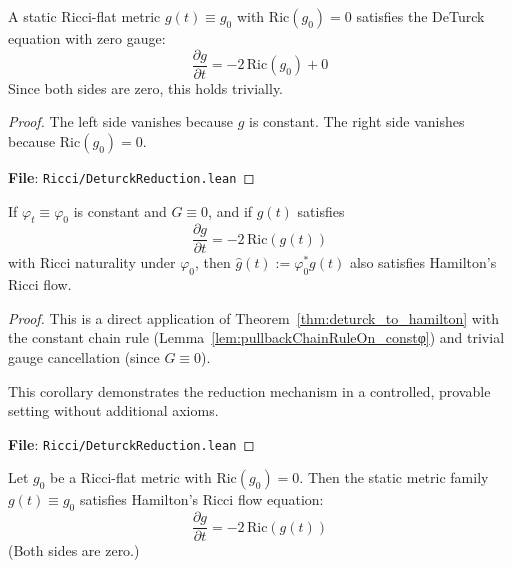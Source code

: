 \begin{lemma}
\label{lem:deturckEqOnWithGauge_ricciFlat_static}
\leanok
{}
A static Ricci-flat metric $g(t) \equiv g_0$ with $\mathrm{Ric}(g_0) = 0$ satisfies the DeTurck equation with zero gauge:
\[ \frac{\partial g}{\partial t} = -2\,\mathrm{Ric}(g_0) + 0 \]
Since both sides are zero, this holds trivially.
\end{lemma}

\begin{proof}
\leanok
The left side vanishes because $g$ is constant. The right side vanishes because $\mathrm{Ric}(g_0) = 0$.

\textbf{File}: \texttt{Ricci/DeturckReduction.lean}
\end{proof}

\begin{corollary}
\label{cor:deturck_to_hamilton_constφ_noGauge}
\leanok
{}
If $\varphi_t \equiv \varphi_0$ is constant and $G \equiv 0$, and if $g(t)$ satisfies
\[ \frac{\partial g}{\partial t} = -2\,\mathrm{Ric}(g(t)) \]
with Ricci naturality under $\varphi_0$, then $\hat{g}(t) := \varphi_0^* g(t)$ also satisfies Hamilton's Ricci flow.
\end{corollary}

\begin{proof}
\leanok
This is a direct application of Theorem~\ref{thm:deturck_to_hamilton} with the constant chain rule (Lemma~\ref{lem:pullbackChainRuleOn_constφ}) and trivial gauge cancellation (since $G \equiv 0$).

This corollary demonstrates the reduction mechanism in a controlled, provable setting without additional axioms.

\textbf{File}: \texttt{Ricci/DeturckReduction.lean}
\end{proof}

\begin{corollary}
\label{cor:deturck_to_hamilton_id_ricciFlat}
\leanok
{}
Let $g_0$ be a Ricci-flat metric with $\mathrm{Ric}(g_0) = 0$. Then the static metric family $g(t) \equiv g_0$ satisfies Hamilton's Ricci flow equation:
\[ \frac{\partial g}{\partial t} = -2\,\mathrm{Ric}(g(t)) \]
(Both sides are zero.)
\end{corollary}

